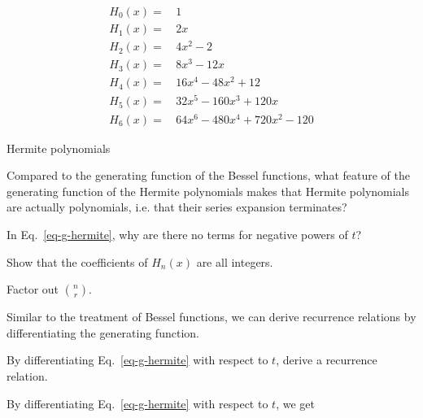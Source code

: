 \begin{table}
\begin{align}
H_0(x) = & \, 1 \nonumber \\
H_1(x) = & \, 2x \nonumber \\
H_2(x) = & \, 4x^2-2 \nonumber \\
H_3(x) = & \, 8x^3-12x \nonumber \\
H_4(x) = & \, 16x^4-48x^2+12 \nonumber \\
H_5(x) = & \, 32x^5-160x^3+120x \nonumber \\
H_6(x) = & \, 64x^6-480x^4+720x^2-120 \nonumber
\end{align}
\caption{Hermite polynomials}
\label{tab-hermite}
\end{table}

\pagebreak

\begin{exer}
Compared to the generating function of the Bessel functions, what feature of the generating function of the Hermite polynomials makes that Hermite polynomials are actually polynomials, i.e. that their series expansion terminates?
\end{exer}

\begin{exer}
In Eq.~\ref{eq-g-hermite}, why are there no terms for negative powers of $t$?
\end{exer}

\begin{exer}
Show that the coefficients of $H_n(x)$ are all integers.
\begin{hnt}
Factor out $n \choose r$.  
\end{hnt}
\end{exer}

\pagebreak


\label{week5}

Similar to the treatment of Bessel functions, we can derive recurrence relations by differentiating the generating function.

\begin{cue}
By differentiating Eq.~\ref{eq-g-hermite} with respect to $t$, derive a recurrence relation.
\end{cue}
 
By differentiating Eq.~\ref{eq-g-hermite} with respect to $t$, we get

